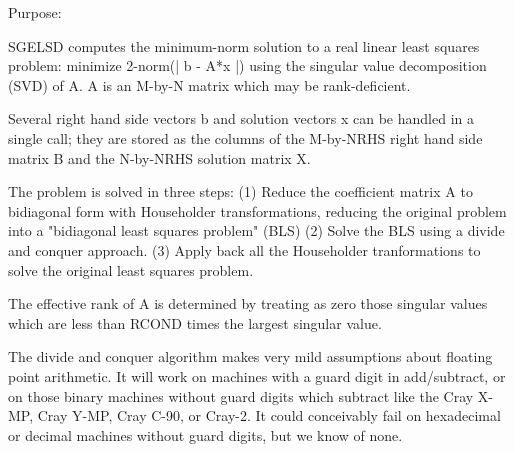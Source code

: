  \begin{DoxyParagraph}{Purpose\+: }
\begin{DoxyVerb} SGELSD computes the minimum-norm solution to a real linear least
 squares problem:
     minimize 2-norm(| b - A*x |)
 using the singular value decomposition (SVD) of A. A is an M-by-N
 matrix which may be rank-deficient.

 Several right hand side vectors b and solution vectors x can be
 handled in a single call; they are stored as the columns of the
 M-by-NRHS right hand side matrix B and the N-by-NRHS solution
 matrix X.

 The problem is solved in three steps:
 (1) Reduce the coefficient matrix A to bidiagonal form with
     Householder transformations, reducing the original problem
     into a "bidiagonal least squares problem" (BLS)
 (2) Solve the BLS using a divide and conquer approach.
 (3) Apply back all the Householder tranformations to solve
     the original least squares problem.

 The effective rank of A is determined by treating as zero those
 singular values which are less than RCOND times the largest singular
 value.

 The divide and conquer algorithm makes very mild assumptions about
 floating point arithmetic. It will work on machines with a guard
 digit in add/subtract, or on those binary machines without guard
 digits which subtract like the Cray X-MP, Cray Y-MP, Cray C-90, or
 Cray-2. It could conceivably fail on hexadecimal or decimal machines
 without guard digits, but we know of none.\end{DoxyVerb}
 
\end{DoxyParagraph}

